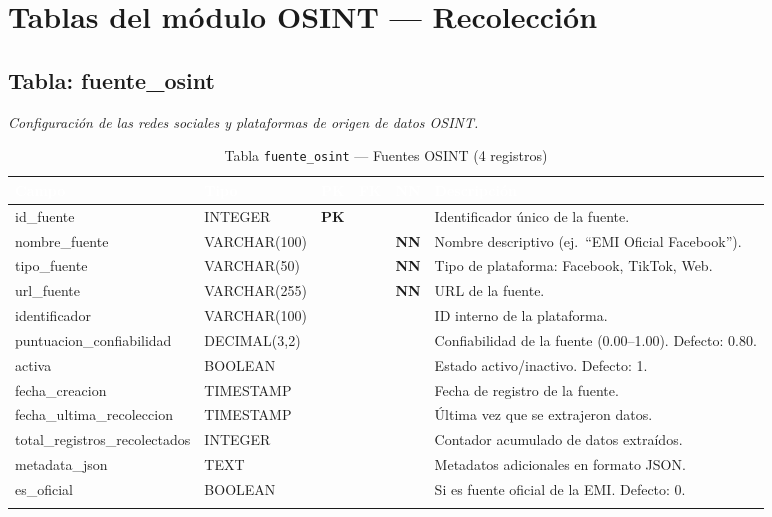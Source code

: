 \documentclass[11pt,a4paper]{article}
\newcommand{\tableheadrow}{\rowcolor{tableheader}}
\newcommand{\tablehead}[1]{\textcolor{white}{\textbf{#1}}}
\newcommand{\pk}{\textcolor{emiblue}{\textbf{PK}}}
\newcommand{\nn}{\textcolor{red!70!black}{\textbf{NN}}}
\begin{document}
\section{Tablas del módulo OSINT — Recolección}

\subsection{Tabla: fuente\_osint}
\textit{Configuración de las redes sociales y plataformas de origen de datos OSINT.}

\begin{longtable}{p{4.2cm} p{2.8cm} c c c p{4.5cm}}
\toprule
\tableheadrow
\tablehead{Campo} & \tablehead{Tipo} & \tablehead{PK} & \tablehead{FK} & \tablehead{NN} & \tablehead{Descripción} \\
\midrule
\endhead
id\_fuente & INTEGER & \pk & & & Identificador único de la fuente. \\
\rowcolor{tablerow}
nombre\_fuente & VARCHAR(100) & & & \nn & Nombre descriptivo (ej.\ ``EMI Oficial Facebook''). \\
tipo\_fuente & VARCHAR(50) & & & \nn & Tipo de plataforma: Facebook, TikTok, Web. \\
\rowcolor{tablerow}
url\_fuente & VARCHAR(255) & & & \nn & URL de la fuente. \\
identificador & VARCHAR(100) & & & & ID interno de la plataforma. \\
\rowcolor{tablerow}
puntuacion\_confiabilidad & DECIMAL(3,2) & & & & Confiabilidad de la fuente (0.00--1.00). Defecto: 0.80. \\
activa & BOOLEAN & & & & Estado activo/inactivo. Defecto: 1. \\
\rowcolor{tablerow}
fecha\_creacion & TIMESTAMP & & & & Fecha de registro de la fuente. \\
fecha\_ultima\_recoleccion & TIMESTAMP & & & & Última vez que se extrajeron datos. \\
\rowcolor{tablerow}
total\_registros\_recolectados & INTEGER & & & & Contador acumulado de datos extraídos. \\
\rowcolor{tablerow}
metadata\_json & TEXT & & & & Metadatos adicionales en formato JSON. \\
es\_oficial & BOOLEAN & & & & Si es fuente oficial de la EMI. Defecto: 0. \\
\bottomrule
\caption{Tabla \texttt{fuente\_osint} — Fuentes OSINT (4 registros)}
\end{longtable}
\end{document}
